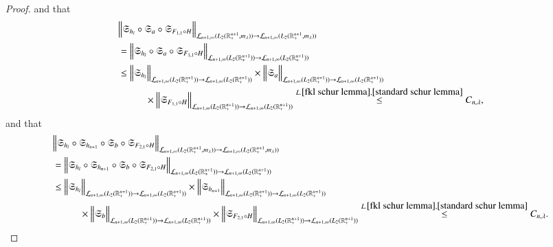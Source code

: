 \documentclass[12pt]{amsart}
\begin{document}
\begin{proof}
and that
\begin{align*}
&\Big\|\mathfrak{S}_{h_l}\circ\mathfrak{S}_a\circ\mathfrak{S}_{F_{1,1}\circ H}\Big\|_{\mathcal{L}_{n+1,\infty}(L_2(\mathbb{R}^{n+1}_+,m_{\lambda}))\to \mathcal{L}_{n+1,\infty}(L_2(\mathbb{R}^{n+1}_+,m_{\lambda}))}\\
&=\Big\|\mathfrak{S}_{h_l}\circ\mathfrak{S}_a\circ\mathfrak{S}_{F_{1,1}\circ H}\Big\|_{\mathcal{L}_{n+1,\infty}(L_2(\mathbb{R}^{n+1}_+))\to \mathcal{L}_{n+1,\infty}(L_2(\mathbb{R}^{n+1}_+))}\\
&\leq \Big\|\mathfrak{S}_{h_l}\Big\|_{\mathcal{L}_{n+1,\infty}(L_2(\mathbb{R}^{n+1}_+))\to \mathcal{L}_{n+1,\infty}(L_2(\mathbb{R}^{n+1}_+))}\times \Big\|\mathfrak{S}_a\Big\|_{\mathcal{L}_{n+1,\infty}(L_2(\mathbb{R}^{n+1}_+))\to \mathcal{L}_{n+1,\infty}(L_2(\mathbb{R}^{n+1}_+))}\\
&\hspace{1.0cm}\times \Big\|\mathfrak{S}_{F_{1,1}\circ H}\Big\|_{\mathcal{L}_{n+1,\infty}(L_2(\mathbb{R}^{n+1}_+))\to \mathcal{L}_{n+1,\infty}(L_2(\mathbb{R}^{n+1}_+))}\stackrel{L.\ref{fkl schur lemma},\ref{standard schur lemma}}{\leq}{C_{n,\lambda}},
\end{align*}
and that
\begin{align*}
&\Big\|\mathfrak{S}_{h_l}\circ\mathfrak{S}_{h_{n+1}}\circ\mathfrak{S}_b\circ\mathfrak{S}_{F_{2,1}\circ H}\Big\|_{\mathcal{L}_{n+1,\infty}(L_2(\mathbb{R}^{n+1}_+,m_{\lambda}))\to \mathcal{L}_{n+1,\infty}(L_2(\mathbb{R}^{n+1}_+,m_{\lambda}))}\\
&=\Big\|\mathfrak{S}_{h_l}\circ\mathfrak{S}_{h_{n+1}}\circ\mathfrak{S}_b\circ\mathfrak{S}_{F_{2,1}\circ H}\Big\|_{\mathcal{L}_{n+1,\infty}(L_2(\mathbb{R}^{n+1}_+))\to \mathcal{L}_{n+1,\infty}(L_2(\mathbb{R}^{n+1}_+))}\\
&\leq \Big\|\mathfrak{S}_{h_l}\Big\|_{\mathcal{L}_{n+1,\infty}(L_2(\mathbb{R}^{n+1}_+))\to \mathcal{L}_{n+1,\infty}(L_2(\mathbb{R}^{n+1}_+))}\times \Big\|\mathfrak{S}_{h_{n+1}}\Big\|_{\mathcal{L}_{n+1,\infty}(L_2(\mathbb{R}^{n+1}_+))\to \mathcal{L}_{n+1,\infty}(L_2(\mathbb{R}^{n+1}_+))}\\
&\hspace{1.0cm}\times\Big\|\mathfrak{S}_b\Big\|_{\mathcal{L}_{n+1,\infty}(L_2(\mathbb{R}^{n+1}_+))\to \mathcal{L}_{n+1,\infty}(L_2(\mathbb{R}^{n+1}_+))}\times \Big\|\mathfrak{S}_{F_{2,1}\circ H}\Big\|_{\mathcal{L}_{n+1,\infty}(L_2(\mathbb{R}^{n+1}_+))\to \mathcal{L}_{n+1,\infty}(L_2(\mathbb{R}^{n+1}_+))}\stackrel{L.\ref{fkl schur lemma},\ref{standard schur lemma}}{\leq}{C_{n,\lambda}}.
\end{align*}

\end{proof}
\end{document}
